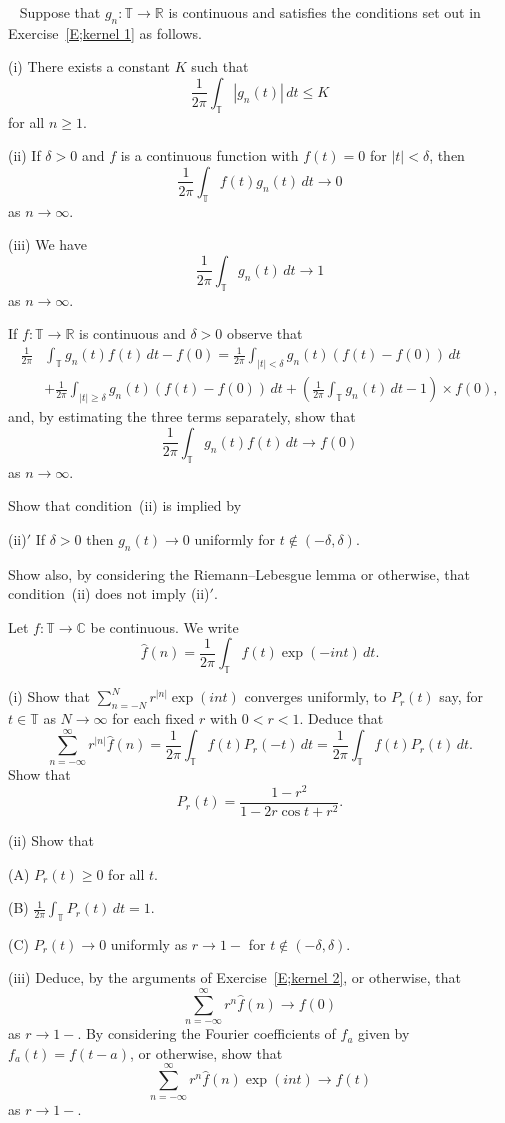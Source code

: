 \begin{exercise}~\label{E;kernel 2}\label{C5.7} 
Suppose that 
$g_{n}:{\mathbb T}\rightarrow{\mathbb R}$
is continuous and satisfies the conditions
set out in Exercise~\ref{E;kernel 1} as follows.

(i) There exists a constant $K$
such that
\[\frac{1}{2\pi}\int_{\mathbb T}|g_{n}(t)|\,dt\leq K\]
for all $n\geq 1$.

(ii) If $\delta>0$ and $f$ is a continuous function
with $f(t)=0$ for $|t|<\delta$, then
\[\frac{1}{2\pi}\int_{\mathbb T}f(t)g_{n}(t)\,dt\rightarrow 0\]
as $n\rightarrow \infty$.

(iii) We have
\[\frac{1}{2\pi}\int_{\mathbb T}g_{n}(t)\,dt\rightarrow 1\]
as $n\rightarrow\infty$.

If $f:{\mathbb T}\rightarrow{\mathbb R}$ is continuous
and $\delta>0$ observe that
\begin{align*}
\frac{1}{2\pi}&\int_{\mathbb T}g_{n}(t)f(t)\,dt-f(0)
=\frac{1}{2\pi}\int_{|t|<\delta}g_{n}(t)(f(t)-f(0))\,dt\\
&+\frac{1}{2\pi}\int_{|t|\geq\delta}g_{n}(t)(f(t)-f(0))\,dt
+\left(\frac{1}{2\pi}\int_{\mathbb T}g_{n}(t)\,dt-1\right)\times f(0),
\end{align*}
and, by estimating the three terms separately,
show that
\[\frac{1}{2\pi}\int_{\mathbb T}g_{n}(t)f(t)\,dt
\rightarrow f(0)\]
as $n\rightarrow\infty$.

Show that condition~(ii) is implied by

(ii)$'$ If $\delta>0$ then $g_{n}(t)\rightarrow 0$ uniformly
for $t\notin(-\delta,\delta)$.

\noindent Show also, by considering the Riemann--Lebesgue lemma
or otherwise, that condition~(ii) does not imply (ii)$'$.



\end{exercise}
\begin{exercise}\label{C5.8}\label{E;kernel 3} Let 
$f:{\mathbb T}\rightarrow{\mathbb C}$
be continuous. We write
\[\hat{f}(n)=\frac{1}{2\pi}\int_{\mathbb T}f(t)\exp(-int)\,dt.\]

(i) Show that $\sum_{n=-N}^{N}r^{|n|}\exp(int)$ converges
uniformly, to $P_{r}(t)$ say, for $t\in{\mathbb T}$ as $N\rightarrow\infty$
for each fixed $r$ with $0<r<1$. Deduce that
\[\sum_{n=-\infty}^{\infty}r^{|n|}\hat{f}(n)
=\frac{1}{2\pi}\int_{\mathbb T}f(t)P_{r}(-t)\,dt
=\frac{1}{2\pi}\int_{\mathbb T}f(t)P_{r}(t)\,dt.\]
Show that
\[P_{r}(t)=\frac{1-r^{2}}{1-2r\cos t+r^{2}}.\]

(ii) Show that

(A) $P_{r}(t)\geq 0$ for all $t$.

(B) ${\displaystyle\frac{1}{2\pi}\int_{\mathbb T}P_{r}(t)\,dt=1}$.

(C) $P_{r}(t)\rightarrow 0$ uniformly as $r\rightarrow 1-$ 
for $t\notin(-\delta,\delta)$.

(iii) Deduce, by the arguments of Exercise~\ref{E;kernel 2},
or otherwise, that
\[\sum_{n=-\infty}^{\infty}r^{n}\hat{f}(n)\rightarrow f(0)\]
as $r\rightarrow 1-$. By considering the Fourier coefficients
of $f_{a}$ given by $f_{a}(t)=f(t-a)$, or otherwise, show that
\[\sum_{n=-\infty}^{\infty}r^{n}\hat{f}(n)\exp(int)\rightarrow f(t)\]
as $r\rightarrow 1-$.
\end{exercise}
